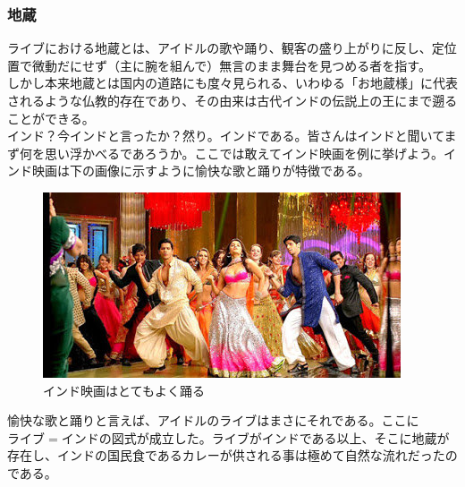 \subsubsection{地蔵}

ライブにおける地蔵とは、アイドルの歌や踊り、観客の盛り上がりに反し、定位置で微動だにせず（主に腕を組んで）無言のまま舞台を見つめる者を指す。\\
しかし本来地蔵とは国内の道路にも度々見られる、いわゆる「お地蔵様」に代表されるような仏教的存在であり、その由来は古代インドの伝説上の王にまで遡ることができる。\\
インド？今インドと言ったか？然り。インドである。皆さんはインドと聞いてまず何を思い浮かべるであろうか。ここでは敢えてインド映画を例に挙げよう。インド映画は下の画像に示すように愉快な歌と踊りが特徴である。

\begin{figure}[H]
\centering
\includegraphics[scale=0.8]{./section/sasakiLIVE/figures/indo.jpg}
\caption{インド映画はとてもよく踊る}
\label{indo}
\end{figure}

愉快な歌と踊りと言えば、アイドルのライブはまさにそれである。ここに$ライブ=インド$の図式が成立した。ライブがインドである以上、そこに地蔵が存在し、インドの国民食であるカレーが供される事は極めて自然な流れだったのである。

\newpage
\clearpage
